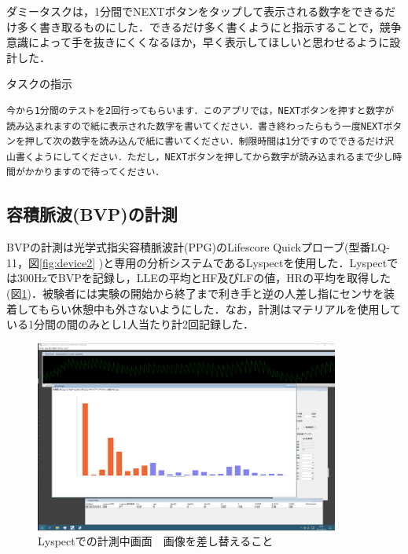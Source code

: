 ダミータスクは，1分間でNEXTボタンをタップして表示される数字をできるだけ多く書き取るものにした．できるだけ多く書くようにと指示することで，競争意識によって手を抜きにくくなるほか，早く表示してほしいと思わせるように設計した．

\begin{itembox}[l]{タスクの指示}
\begin{verbatim}
今から1分間のテストを2回行ってもらいます．このアプリでは，NEXTボタンを押すと数字が読み込まれますので紙に表示された数字を書いてください．書き終わったらもう一度NEXTボタンを押して次の数字を読み込んで紙に書いてください．制限時間は1分ですのでできるだけ沢山書くようにしてください．ただし，NEXTボタンを押してから数字が読み込まれるまで少し時間がかかりますので待ってください．
\end{verbatim}
\end{itembox}

\subsection{容積脈波(BVP)の計測}
BVPの計測は光学式指尖容積脈波計(PPG)のLifescore Quickプローブ(型番LQ-11，図\ref{fig:device2} )と専用の分析システムであるLyspect\cite{chaotechlyspect}を使用した．Lyspectでは300HzでBVPを記録し，LLEの平均とHF及びLFの値，HRの平均を取得した(図\ref{fig:lyspect})．被験者には実験の開始から終了まで利き手と逆の人差し指にセンサを装着してもらい休憩中も外さないようにした．なお，計測はマテリアルを使用している1分間の間のみとし1人当たり計2回記録した．

\begin{figure}[htbp]
  \begin{minipage}{\hsize}
    \begin{center}
       \includegraphics[width=100mm]{img/lyspect.png}
    \end{center}
    \caption{Lyspectでの計測中画面　画像を差し替えること}
    \label{fig:lyspect}
  \end{minipage}
\end{figure}

